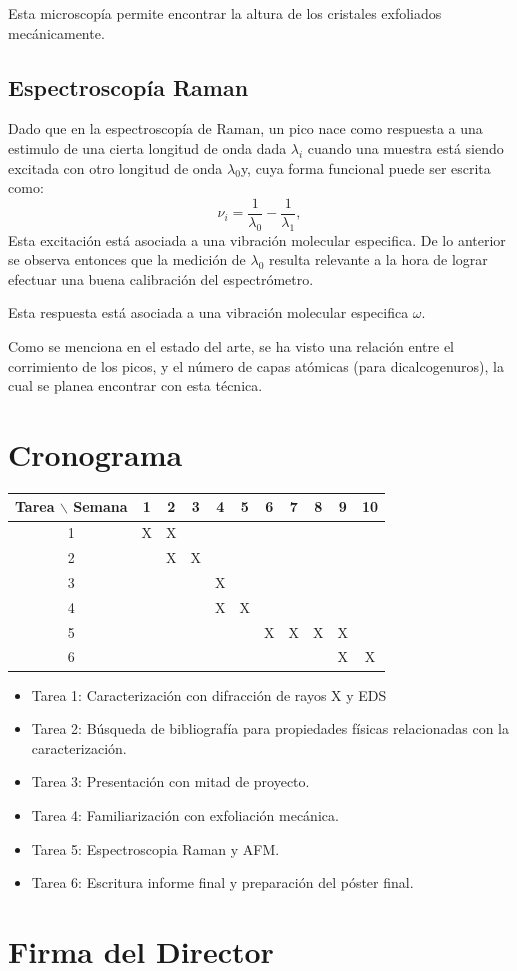 \documentclass{article}
\begin{document}
 Esta microscopía permite encontrar la altura de los cristales exfoliados mecánicamente.

\subsection{Espectroscopía Raman}
Dado que en la espectroscopía de Raman, un pico nace como respuesta a una estimulo de una cierta longitud de onda dada $\lambda_i$ cuando una muestra está siendo excitada con otro longitud de onda $\lambda_0$y, cuya forma funcional puede ser escrita como:
\[\nu_{i}=\frac{1}{\lambda_0}-\frac{1}{\lambda_1},\]
Esta excitación está asociada a una vibración molecular especifica.
 De lo anterior se observa entonces que la medición de $\lambda_0$ resulta relevante a la hora de lograr efectuar una buena calibración del espectrómetro.

Esta respuesta está asociada a una vibración molecular especifica $\omega$.

Como se menciona en el estado del arte, se ha visto una relación entre el corrimiento de los picos, y el número de capas atómicas (para dicalcogenuros), la cual se planea encontrar con esta técnica.


\section{Cronograma}

\begin{table}[htb]
	\begin{tabular}{|c|cccccccccc|}
	\hline
	Tarea $\backslash$ Semana & 1 & 2 & 3 & 4 & 5 & 6 & 7 & 8 & 9 & 10\\
	\hline
	1 & X & X &  &  &   &   &   &  &  &        \\
	2 &   & X & X&  &  &  &  &   &   &   \\
	3 &   &   &   & X  &   &   &   & &   &    \\
	4 & & & & X& X& & & & &               \\
	5 &  &  &  &  &  & X &  X& X & X &     \\
	6& & & & & & & & &X & X              \\
	\hline
	\end{tabular}
\end{table}
\vspace{1mm}

\begin{itemize}
	\item Tarea 1: Caracterización con difracción de rayos X y EDS
	\item Tarea 2: Búsqueda de bibliografía para propiedades físicas relacionadas con la caracterización.
	\item Tarea 3: Presentación con mitad de proyecto.
	\item Tarea 4: Familiarización con exfoliación mecánica.
	\item Tarea 5: Espectroscopia Raman y AFM.
	\item Tarea 6: Escritura informe final y preparación del póster final. 

\end{itemize}

\section*{Firma del Director}
\vspace{1.5cm}




\end{document}
